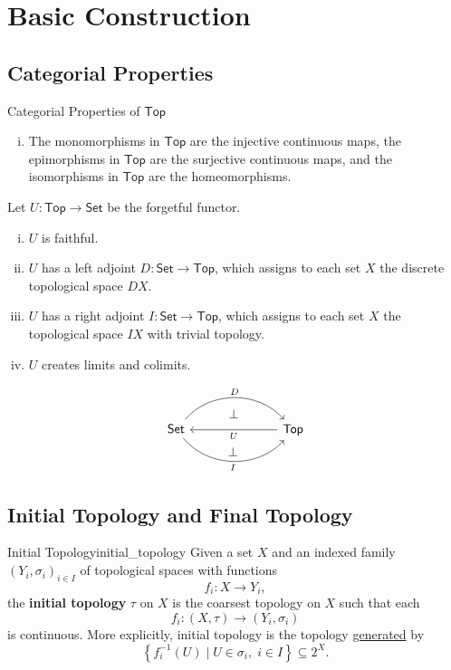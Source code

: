 \documentclass{report}
\begin{document}
\section{Basic Construction}
\subsection{Categorial Properties}

\begin{proposition}{Categorial Properties of $\mathsf{Top}$}{}
	\begin{enumerate}[(i)]
		\item The monomorphisms in $\mathsf{Top}$ are the injective continuous maps, the epimorphisms in $\mathsf{Top}$ are the surjective continuous maps, and the isomorphisms in $\mathsf{Top}$ are the homeomorphisms.
	\end{enumerate}
\end{proposition}

\begin{proposition}{}{}
	Let $U:\mathsf{Top}\to\mathsf{Set}$ be the forgetful functor.
	\begin{enumerate}[(i)]
		\item $U$ is faithful.
		\item $U$ has a left adjoint $D:\mathsf{Set}\to\mathsf{Top}$, which assigns to each set $X$ the discrete topological space $DX$.
		\item $U$ has a right adjoint $I:\mathsf{Set}\to\mathsf{Top}$, which assigns to each set $X$ the topological space $IX$ with trivial topology.
		\item $U$ creates limits and colimits.
	\end{enumerate}
	\[
		\begin{tikzcd}[ampersand replacement=\&]
			\mathsf{Set}  \arrow[r, "D"{name=A, above}, bend left=49] \arrow[r, "I"'{name=C, below}, bend right=49] \&[+45pt] \mathsf{Top} \arrow[l, "U"'{name=B, below}]
			\arrow[phantom, shorten <=5.5pt, shorten >=5.5pt, from=A.south-|B, to=B, "\bot"']
			\arrow[phantom, shorten <=5.5pt, shorten >=5.5pt, from=B.south-|C, to=C, "\bot"']
		\end{tikzcd}
	\]
\end{proposition}
\subsection{Initial Topology and Final Topology}
\begin{definition}{Initial Topology}{initial_topology}
	Given a set $X$ and an indexed family $\left(Y_i, \sigma_i\right)_{i \in I}$ of topological spaces with functions
	$$
	f_i: X \rightarrow Y_i,
	$$
	the \textbf{initial topology} $\tau$ on $X$ is the coarsest topology on $X$ such that each
	$$
	f_i:(X, \tau) \rightarrow (Y_i, \sigma_i)
	$$
	is continuous. More explicitly, initial topology is the topology \hyperref[th:generated_topology]{generated} by 
	\[
	\left\{ f^{-1}_i(U) \mid U\in \sigma_i, \;i \in I \right\}\subseteq 2^X.
	\]
\end{definition}
\end{document}
